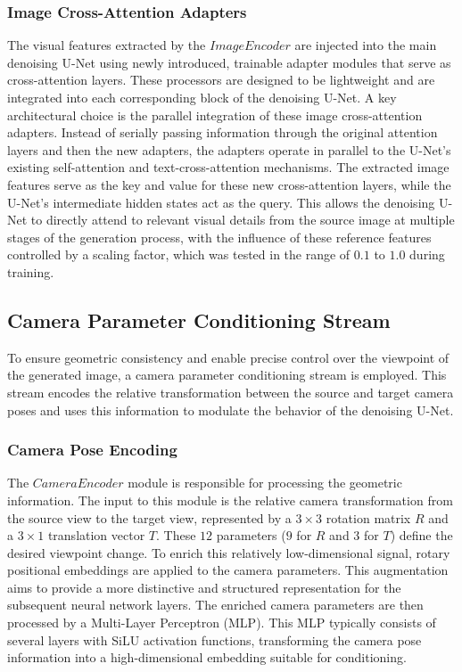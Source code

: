 \subsubsection{Image Cross-Attention Adapters}
The visual features extracted by the $ImageEncoder$ are injected into the main denoising U-Net using newly introduced, trainable adapter modules that serve as cross-attention layers. These processors are designed to be lightweight and are integrated into each corresponding block of the denoising U-Net.
A key architectural choice is the parallel integration of these image cross-attention adapters. Instead of serially passing information through the original attention layers and then the new adapters, the adapters operate in parallel to the U-Net's existing self-attention and text-cross-attention mechanisms. The extracted image features serve as the key and value for these new cross-attention layers, while the U-Net's intermediate hidden states act as the query. This allows the denoising U-Net to directly attend to relevant visual details from the source image at multiple stages of the generation process, with the influence of these reference features controlled by a scaling factor, which was tested in the range of $0.1$ to $1.0$ during training.

\subsection{Camera Parameter Conditioning Stream}
To ensure geometric consistency and enable precise control over the viewpoint of the generated image, a camera parameter conditioning stream is employed. This stream encodes the relative transformation between the source and target camera poses and uses this information to modulate the behavior of the denoising U-Net.

\subsubsection{Camera Pose Encoding}
The $CameraEncoder$ module is responsible for processing the geometric information.
The input to this module is the relative camera transformation from the source view to the target view, represented by a $3 \times 3$ rotation matrix $R$ and a $3 \times 1$ translation vector $T$. These $12$ parameters ($9$ for $R$ and $3$ for $T$) define the desired viewpoint change.
To enrich this relatively low-dimensional signal, rotary positional embeddings are applied to the camera parameters. This augmentation aims to provide a more distinctive and structured representation for the subsequent neural network layers.
The enriched camera parameters are then processed by a Multi-Layer Perceptron (MLP). This MLP typically consists of several layers with SiLU activation functions, transforming the camera pose information into a high-dimensional embedding suitable for conditioning.

